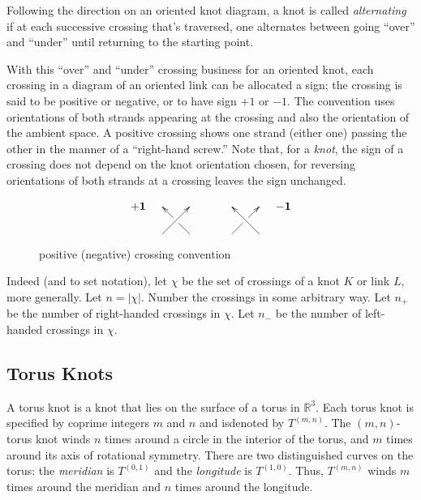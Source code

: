 \documentclass[a4paper,titlepage,twoside]{book}
\begin{document}
Following the direction on an oriented knot diagram, a knot is called \emph{alternating} if at each successive crossing that's traversed, one alternates between going ``over'' and ``under'' until returning to the starting point.

With this ``over'' and ``under'' crossing business for an oriented knot, each crossing in a diagram of an oriented link can be allocated a sign; the crossing is said to be positive or negative, or to have sign $+1$ or $-1$. The convention uses orientations of both strands appearing at the crossing and also the orientation of the ambient space. A positive crossing shows one strand (either one) passing the other in the manner of a ``right-hand screw.''  Note that, for a \emph{knot}, the sign of a crossing does not depend on the knot orientation chosen, for reversing orientations of both strands at a crossing leaves the sign unchanged.  

\begin{figure}[h]
\[
\begin{gathered}
\mathbf{+1 } \quad \, \xygraph{ 
  !{0;/r2.0pc/:}
  !{\xoverv[-1]=>}
  } \quad \quad \quad \, 
\xygraph{
  !{0;/r2.0pc/:}
  !{\xunderv[-1]=>}
  }
\quad \, \mathbf{-1}
\end{gathered}
\]
\caption{positive (negative) crossing convention } \label{Fig:CrossingConvention}
\end{figure}

Indeed (and to set notation), let $\chi$ be the set of crossings of a knot $K$ or link $L$, more generally.  Let $n = |\chi |$.  Number the crossings in some arbitrary way.  Let $n_+$ be the number of right-handed crossings in $\chi$.  Let $n_-$ be the number of left-handed crossings in $\chi$.  





\subsection{Torus Knots } 

A torus knot is a knot that lies on the surface of a torus in $\mathbb{R}^3$.  Each torus knot is specified by coprime integers $m$ and $n$ and isdenoted by $T^{(m,n)}$.  The $(m,n)$-torus knot winds $n$ times around a circle in the interior of the torus, and $m$ times around its axis of rotational symmetry.  There are two distinguished curves on the torus: the \emph{meridian} is $T^{(0,1)}$ and the \emph{longitude} is $T^{(1,0)}$.  Thus, $T^{(m,n)}$ winds $m$ times around the meridian and $n$ times around the longitude. 
\end{document}
